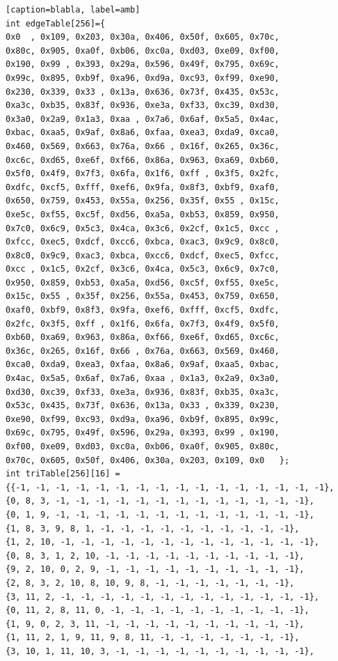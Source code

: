 \documentclass[12pt]{article}
\begin{document}
\begin{lstlisting}[frame=single][caption=blabla, label=amb]
int edgeTable[256]={
0x0  , 0x109, 0x203, 0x30a, 0x406, 0x50f, 0x605, 0x70c,
0x80c, 0x905, 0xa0f, 0xb06, 0xc0a, 0xd03, 0xe09, 0xf00,
0x190, 0x99 , 0x393, 0x29a, 0x596, 0x49f, 0x795, 0x69c,
0x99c, 0x895, 0xb9f, 0xa96, 0xd9a, 0xc93, 0xf99, 0xe90,
0x230, 0x339, 0x33 , 0x13a, 0x636, 0x73f, 0x435, 0x53c,
0xa3c, 0xb35, 0x83f, 0x936, 0xe3a, 0xf33, 0xc39, 0xd30,
0x3a0, 0x2a9, 0x1a3, 0xaa , 0x7a6, 0x6af, 0x5a5, 0x4ac,
0xbac, 0xaa5, 0x9af, 0x8a6, 0xfaa, 0xea3, 0xda9, 0xca0,
0x460, 0x569, 0x663, 0x76a, 0x66 , 0x16f, 0x265, 0x36c,
0xc6c, 0xd65, 0xe6f, 0xf66, 0x86a, 0x963, 0xa69, 0xb60,
0x5f0, 0x4f9, 0x7f3, 0x6fa, 0x1f6, 0xff , 0x3f5, 0x2fc,
0xdfc, 0xcf5, 0xfff, 0xef6, 0x9fa, 0x8f3, 0xbf9, 0xaf0,
0x650, 0x759, 0x453, 0x55a, 0x256, 0x35f, 0x55 , 0x15c,
0xe5c, 0xf55, 0xc5f, 0xd56, 0xa5a, 0xb53, 0x859, 0x950,
0x7c0, 0x6c9, 0x5c3, 0x4ca, 0x3c6, 0x2cf, 0x1c5, 0xcc ,
0xfcc, 0xec5, 0xdcf, 0xcc6, 0xbca, 0xac3, 0x9c9, 0x8c0,
0x8c0, 0x9c9, 0xac3, 0xbca, 0xcc6, 0xdcf, 0xec5, 0xfcc,
0xcc , 0x1c5, 0x2cf, 0x3c6, 0x4ca, 0x5c3, 0x6c9, 0x7c0,
0x950, 0x859, 0xb53, 0xa5a, 0xd56, 0xc5f, 0xf55, 0xe5c,
0x15c, 0x55 , 0x35f, 0x256, 0x55a, 0x453, 0x759, 0x650,
0xaf0, 0xbf9, 0x8f3, 0x9fa, 0xef6, 0xfff, 0xcf5, 0xdfc,
0x2fc, 0x3f5, 0xff , 0x1f6, 0x6fa, 0x7f3, 0x4f9, 0x5f0,
0xb60, 0xa69, 0x963, 0x86a, 0xf66, 0xe6f, 0xd65, 0xc6c,
0x36c, 0x265, 0x16f, 0x66 , 0x76a, 0x663, 0x569, 0x460,
0xca0, 0xda9, 0xea3, 0xfaa, 0x8a6, 0x9af, 0xaa5, 0xbac,
0x4ac, 0x5a5, 0x6af, 0x7a6, 0xaa , 0x1a3, 0x2a9, 0x3a0,
0xd30, 0xc39, 0xf33, 0xe3a, 0x936, 0x83f, 0xb35, 0xa3c,
0x53c, 0x435, 0x73f, 0x636, 0x13a, 0x33 , 0x339, 0x230,
0xe90, 0xf99, 0xc93, 0xd9a, 0xa96, 0xb9f, 0x895, 0x99c,
0x69c, 0x795, 0x49f, 0x596, 0x29a, 0x393, 0x99 , 0x190,
0xf00, 0xe09, 0xd03, 0xc0a, 0xb06, 0xa0f, 0x905, 0x80c,
0x70c, 0x605, 0x50f, 0x406, 0x30a, 0x203, 0x109, 0x0   };
int triTable[256][16] =
{{-1, -1, -1, -1, -1, -1, -1, -1, -1, -1, -1, -1, -1, -1, -1, -1},
{0, 8, 3, -1, -1, -1, -1, -1, -1, -1, -1, -1, -1, -1, -1, -1},
{0, 1, 9, -1, -1, -1, -1, -1, -1, -1, -1, -1, -1, -1, -1, -1},
{1, 8, 3, 9, 8, 1, -1, -1, -1, -1, -1, -1, -1, -1, -1, -1},
{1, 2, 10, -1, -1, -1, -1, -1, -1, -1, -1, -1, -1, -1, -1, -1},
{0, 8, 3, 1, 2, 10, -1, -1, -1, -1, -1, -1, -1, -1, -1, -1},
{9, 2, 10, 0, 2, 9, -1, -1, -1, -1, -1, -1, -1, -1, -1, -1},
{2, 8, 3, 2, 10, 8, 10, 9, 8, -1, -1, -1, -1, -1, -1, -1},
{3, 11, 2, -1, -1, -1, -1, -1, -1, -1, -1, -1, -1, -1, -1, -1},
{0, 11, 2, 8, 11, 0, -1, -1, -1, -1, -1, -1, -1, -1, -1, -1},
{1, 9, 0, 2, 3, 11, -1, -1, -1, -1, -1, -1, -1, -1, -1, -1},
{1, 11, 2, 1, 9, 11, 9, 8, 11, -1, -1, -1, -1, -1, -1, -1},
{3, 10, 1, 11, 10, 3, -1, -1, -1, -1, -1, -1, -1, -1, -1, -1},

\end{lstlisting}
\end{document}
